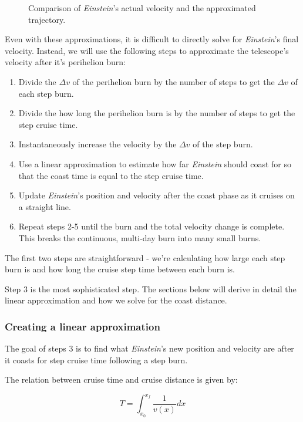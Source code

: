 \documentclass[12pt]{article} %
\begin{document}
\begin{figure}[H]

\caption{Comparison of \textit{Einstein}'s actual velocity and the approximated trajectory.}

\end{figure}


Even with these approximations, it is difficult to directly solve for \textit{Einstein}'s final velocity. Instead, we will use the following steps to approximate the telescope's velocity after it's perihelion burn:

\begin{enumerate}
\item Divide the $\Delta v$ of the perihelion burn by the number of steps to get the $\Delta v$ of each step burn.
\item Divide the how long the perihelion burn is by the number of steps to get the step cruise time. 
\item Instantaneously increase the velocity by the $\Delta v$ of the step burn.
\item Use a linear approximation to estimate how far \textit{Einstein} should coast for so that the coast time is equal to the step cruise time.
\item Update \textit{Einstein}'s position and velocity after the coast phase as it cruises on a straight line.
\item Repeat steps 2-5 until the burn and the total velocity change is complete. This breaks the continuous, multi-day burn into many small burns.
\end{enumerate}

The first two steps are straightforward - we're calculating how large each step burn is and how long the cruise step time between each burn is.

Step 3 is the most sophisticated step. The sections below will derive in detail the linear approximation and how we solve for the coast distance.

\subsubsection{Creating a linear approximation}
The goal of steps 3 is to find what \textit{Einstein}'s new position and velocity are after it coasts for step cruise time following a step burn.

The relation between cruise time and cruise distance is given by: 

$$T = \int_{x_0}^{x_f} \frac{1}{v(x)} dx$$
\end{document}
